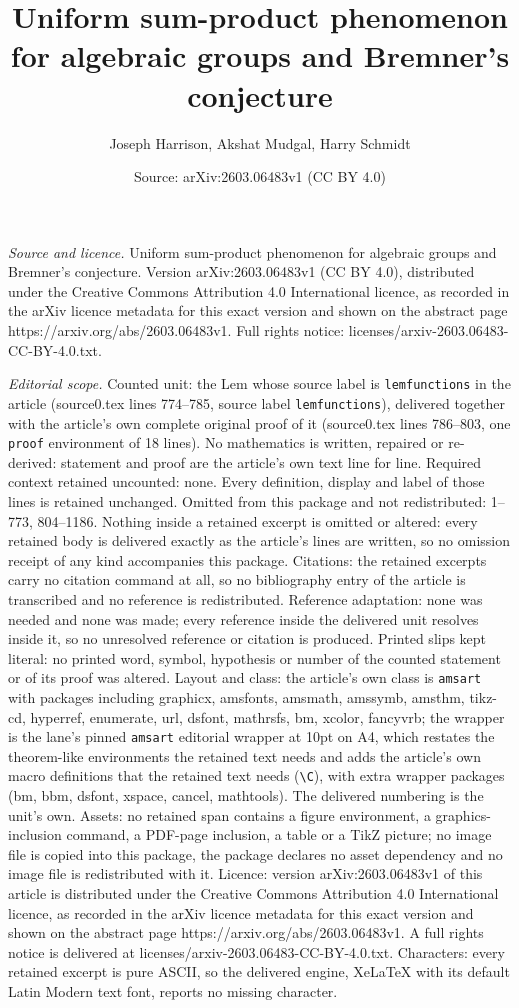 \documentclass[10pt,a4paper]{amsart}
\title[Uniform sum-product phenomenon for algebraic groups and Brem]{Uniform sum-product phenomenon for algebraic groups and Bremner's conjecture}
\author{Joseph Harrison, Akshat Mudgal, Harry Schmidt}
\date{Source: arXiv:2603.06483v1 (CC BY 4.0)}
\begin{document}
\maketitle

\noindent\emph{Source and licence.} Uniform sum-product phenomenon for algebraic groups and Bremner's conjecture. Version arXiv:2603.06483v1 (CC BY 4.0), distributed under the Creative Commons Attribution 4.0 International licence, as recorded in the arXiv licence metadata for this exact version and shown on the abstract page https://arxiv.org/abs/2603.06483v1. Full rights notice: licenses/arxiv-2603.06483-CC-BY-4.0.txt.\par\smallskip

\noindent\textit{Editorial scope.} Counted unit: the Lem whose source label is \texttt{lemfunctions} in the article (source0.tex lines 774--785, source label \texttt{lemfunctions}), delivered together with the article's own complete original proof of it (source0.tex lines 786--803, one \texttt{proof} environment of 18 lines). No mathematics is written, repaired or re-derived: statement and proof are the article's own text line for line. Required context retained uncounted: none. Every definition, display and label of those lines is retained unchanged. Omitted from this package and not redistributed: 1--773, 804--1186. Nothing inside a retained excerpt is omitted or altered: every retained body is delivered exactly as the article's lines are written, so no omission receipt of any kind accompanies this package. Citations: the retained excerpts carry no citation command at all, so no bibliography entry of the article is transcribed and no reference is redistributed. Reference adaptation: none was needed and none was made; every reference inside the delivered unit resolves inside it, so no unresolved reference or citation is produced. Printed slips kept literal: no printed word, symbol, hypothesis or number of the counted statement or of its proof was altered. Layout and class: the article's own class is \texttt{amsart} with packages including graphicx, amsfonts, amsmath, amssymb, amsthm, tikz-cd, hyperref, enumerate, url, dsfont, mathrsfs, bm, xcolor, fancyvrb; the wrapper is the lane's pinned \texttt{amsart} editorial wrapper at 10pt on A4, which restates the theorem-like environments the retained text needs and adds the article's own macro definitions that the retained text needs (\texttt{\textbackslash C}), with extra wrapper packages (bm, bbm, dsfont, xspace, cancel, mathtools). The delivered numbering is the unit's own. Assets: no retained span contains a figure environment, a graphics-inclusion command, a PDF-page inclusion, a table or a TikZ picture; no image file is copied into this package, the package declares no asset dependency and no image file is redistributed with it. Licence: version arXiv:2603.06483v1 of this article is distributed under the Creative Commons Attribution 4.0 International licence, as recorded in the arXiv licence metadata for this exact version and shown on the abstract page https://arxiv.org/abs/2603.06483v1. A full rights notice is delivered at licenses/arxiv-2603.06483-CC-BY-4.0.txt. Characters: every retained excerpt is pure ASCII, so the delivered engine, XeLaTeX with its default Latin Modern text font, reports no missing character.
\end{document}
